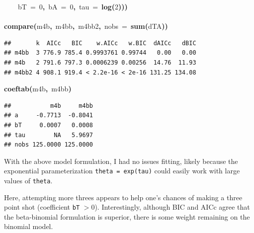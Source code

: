 \documentclass{article}
\makeatletter
\newcommand{\hlnumber}[1]{\textcolor[rgb]{0,0,0}{#1}}%
\newcommand{\hlfunctioncall}[1]{\textcolor[rgb]{.5,0,.33}{\textbf{#1}}}%
\newcommand{\hlkeyword}[1]{\textbf{#1}}%
\newcommand{\hlargument}[1]{\textcolor[rgb]{.69,.25,.02}{#1}}%
\newcommand{\hlsymbol}[1]{#1}%
\newcommand{\hlstd}[1]{\textcolor[rgb]{0,0,0}{#1}}%
\newenvironment{kframe}{%
 \def\FrameCommand##1{\hskip\@totalleftmargin \hskip-\fboxsep
 \colorbox{shadecolor}{##1}\hskip-\fboxsep
     \hskip-\linewidth \hskip-\@totalleftmargin \hskip\columnwidth}%
 \MakeFramed {\advance\hsize-\width
   \@totalleftmargin\z@ \linewidth\hsize
   \@setminipage}}%
 {\par\unskip\endMakeFramed}
\newenvironment{knitrout}{}{} %
\makeatother
\begin{document}
\begin{knitrout}
{\begin{kframe}
\begin{flushleft}
\hlstd{}{\ }{\ }{\ }{\ }\hlargument{bT}{\ }\hlargument{=}{\ }\hlnumber{0}\hlkeyword{,}{\ }\hlargument{bA}{\ }\hlargument{=}{\ }\hlnumber{0}\hlkeyword{,}{\ }\hlargument{tau}{\ }\hlargument{=}{\ }\hlfunctioncall{log}\hlkeyword{(}\hlnumber{2}\hlkeyword{)}\hlkeyword{)}\hlkeyword{)}\hspace*{\fill}\\
\hlstd{}\hspace*{\fill}\\
\hlstd{}\hlfunctioncall{compare}\hlkeyword{(}\hlsymbol{m4b}\hlkeyword{,}{\ }\hlsymbol{m4bb}\hlkeyword{,}{\ }\hlsymbol{m4bb2}\hlkeyword{,}{\ }\hlargument{nobs}{\ }\hlargument{=}{\ }\hlfunctioncall{sum}\hlkeyword{(}\hlsymbol{d}\hlkeyword{\usebox{\hlnormalsizeboxdollar}}\hlsymbol{TA}\hlkeyword{)}\hlkeyword{)}\mbox{}
\normalfont
\end{flushleft}
\begin{verbatim}
##       k  AICc   BIC    w.AICc   w.BIC  dAICc   dBIC
## m4bb  3 776.9 785.4 0.9993761 0.99744   0.00   0.00
## m4b   2 791.6 797.3 0.0006239 0.00256  14.76  11.93
## m4bb2 4 908.1 919.4 < 2.2e-16 < 2e-16 131.25 134.08
\end{verbatim}
\begin{flushleft}
\ttfamily\noindent
\hlfunctioncall{coeftab}\hlkeyword{(}\hlsymbol{m4b}\hlkeyword{,}{\ }\hlsymbol{m4bb}\hlkeyword{)}\mbox{}
\normalfont
\end{flushleft}
\begin{verbatim}
##           m4b     m4bb
## a     -0.7713  -0.8041
## bT     0.0007   0.0008
## tau        NA   5.9697
## nobs 125.0000 125.0000
\end{verbatim}
\end{kframe}}
\end{knitrout}


With the above model formulation, I had no issues fitting, likely because the exponential parameterization {\tt theta = exp(tau)} could easily work with large values of {\tt theta}. 

Here, attempting more threes appears to help one's chances of making a three point shot (coefficient {\tt bT} $>0$). 
Interestingly, although BIC and AICc agree that the beta-binomial formulation is superior, there is some weight remaining on the binomial model.
\end{document}
